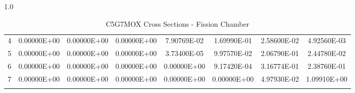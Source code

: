 \begin{sidewaysfigure}
\begin{table}[H]
\begin{subtable}[h]{1.0\textwidth}
{\begin{tabular}{*8c}
4 &	0.00000E+00 &	0.00000E+00 &	0.00000E+00 &	7.90769E-02 &	1.69990E-01 &	2.58600E-02 &	4.92560E-03 \\
5 &	0.00000E+00 &	0.00000E+00 &	0.00000E+00 &	3.73400E-05 &	9.97570E-02 &	2.06790E-01 &	2.44780E-02 \\
6 &	0.00000E+00 &	0.00000E+00 &	0.00000E+00 &	0.00000E+00 &	9.17420E-04 &	3.16774E-01 &	2.38760E-01 \\
7 &	0.00000E+00 &	0.00000E+00 &	0.00000E+00 &	0.00000E+00 &	0.00000E+00 &	4.97930E-02 &	1.09910E+00 \\
        \bottomrule
        & & & & & & & 
    \end{tabular}}
  \end{subtable}
  \caption{C5G7MOX Cross Sections - Fission Chamber}
      \label{table:MOX-Fission}
\end{table}
\end{sidewaysfigure}

